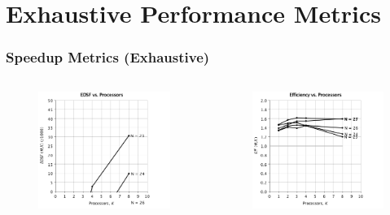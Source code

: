 \documentclass[handout]{beamer}
\begin{document}
\section{Exhaustive Performance Metrics}
\begin{frame}
	\frametitle{Speedup Metrics (Exhaustive)}

\begin{columns}
	\vspace{-1em}
	\begin{figure}
	\centering
	\includegraphics[scale = 0.25]{ge_speed_1.png}
	\end{figure}
	\vspace{-2em}
	\begin{figure}
	\centering
	\includegraphics[scale = 0.25]{ge_speed_2.png}

\end{figure}
\end{columns}
\end{frame}
\end{document}
